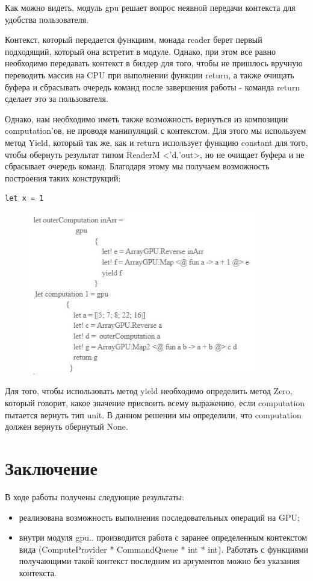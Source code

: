 \documentclass[14pt]{matmex-diploma-custom}
\begin{document}
Как можно видеть, модуль gpu решает вопрос неявной передачи контекста для удобства пользователя.

Контекст, который передается функциям, монада reader берет первый подходящий, который она встретит в модуле. 
Однако, при этом все равно необходимо передавать контекст в билдер для того, чтобы не пришлось вручную переводить массив на CPU при выполнении функции return, а также очищать буфера и сбрасывать очередь команд после завершения работы - команда return сделает это за пользователя.

Однако, нам необходимо иметь также возможность вернуться из композиции computation’ов, не проводя манипуляций с контекстом. Для этого мы используем метод Yield, который так же, как и return использует функцию constant для того, чтобы обернуть результат типом ReaderM <’d,’out>, но не очищает буфера и не сбрасывает очередь команд.
Благодаря этому мы получаем возможность построения таких конструкций:
\begin{verbatim}
let x = 1
\end{verbatim}

\begin{figure}[h] 
\label{code}
\includegraphics[width=0.9\textwidth]{images/code} 
\end{figure}

Для того, чтобы использовать метод yield необходимо определить метод Zero, который говорит, какое значение присвоить всему выражению, если computation пытается вернуть тип unit. В данном решении мы определили, что computation должен вернуть обернутый None.

\section*{Заключение}
В ходе работы получены следующие результаты:
\begin{itemize}
    \item реализована возможность выполнения последовательных операций на GPU;
    \item внутри модуля gpu{..} производится работа с заранее определенным       контекстом вида (ComputeProvider * CommandQueue * int * int). Работать с функциями получающими такой контекст последним из аргументов можно без указания контекста.
\end{itemize}
\end{document}
